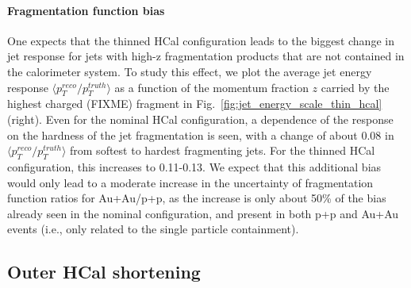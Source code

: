 \paragraph{Fragmentation function bias} 
One expects that the thinned HCal configuration leads to the biggest change in jet response for jets with high-z fragmentation products that
are not contained in the calorimeter system. To study this effect, we plot the average jet energy response 
$\langle p_T^{reco}/p_T^{truth}\rangle$ as a function of the momentum fraction $z$ carried by the highest \pt charged (FIXME) 
fragment in Fig.~\ref{fig:jet_energy_scale_thin_hcal}(right). Even for the nominal HCal configuration, a dependence of the response on the hardness of the jet fragmentation
is seen, with a change of about 0.08 in $\langle p_T^{reco}/p_T^{truth}\rangle$ from softest to hardest fragmenting jets. 
For the thinned HCal configuration, this increases to 0.11-0.13. We expect that this additional bias would only lead to a moderate 
increase in the uncertainty of fragmentation function ratios for Au+Au/p+p, as the increase is only about 50\% of the 
bias already seen in the nominal configuration, and present in both p+p and Au+Au events (i.e., only related to the 
single particle containment). 


\subsection{Outer HCal shortening}

